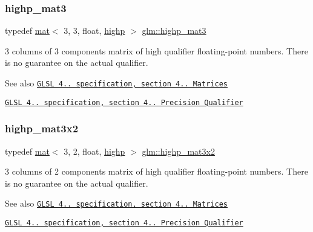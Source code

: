 \subsubsection{\texorpdfstring{highp\+\_\+mat3}{highp\_mat3}}
{\footnotesize\ttfamily typedef \hyperlink{structglm_1_1mat}{mat}$<$ 3, 3, float, \hyperlink{namespaceglm_a36ed105b07c7746804d7fdc7cc90ff25ac6f7eab42eacbb10d59a58e95e362074}{highp} $>$ \hyperlink{group__core__precision_gaa1178bd043ab93d1207bda8d06cd078c}{glm\+::highp\+\_\+mat3}}

3 columns of 3 components matrix of high qualifier floating-\/point numbers. There is no guarantee on the actual qualifier.

\begin{DoxySeeAlso}{See also}
\href{http://www.opengl.org/registry/doc/GLSLangSpec.4.20.8.pdf}{\tt G\+L\+SL 4.. specification, section 4.. Matrices} 

\href{http://www.opengl.org/registry/doc/GLSLangSpec.4.20.8.pdf}{\tt G\+L\+SL 4.. specification, section 4.. Precision Qualifier} 
\end{DoxySeeAlso}
\mbox{\label{group__core__precision_ga2188c0b772ac9d6210d46af34e04f375}} 
\subsubsection{\texorpdfstring{highp\+\_\+mat3x2}{highp\_mat3x2}}
{\footnotesize\ttfamily typedef \hyperlink{structglm_1_1mat}{mat}$<$ 3, 2, float, \hyperlink{namespaceglm_a36ed105b07c7746804d7fdc7cc90ff25ac6f7eab42eacbb10d59a58e95e362074}{highp} $>$ \hyperlink{group__core__precision_ga2188c0b772ac9d6210d46af34e04f375}{glm\+::highp\+\_\+mat3x2}}

3 columns of 2 components matrix of high qualifier floating-\/point numbers. There is no guarantee on the actual qualifier.

\begin{DoxySeeAlso}{See also}
\href{http://www.opengl.org/registry/doc/GLSLangSpec.4.20.8.pdf}{\tt G\+L\+SL 4.. specification, section 4.. Matrices} 

\href{http://www.opengl.org/registry/doc/GLSLangSpec.4.20.8.pdf}{\tt G\+L\+SL 4.. specification, section 4.. Precision Qualifier} 
\end{DoxySeeAlso}
\mbox{\label{group__core__precision_ga83105b0c326393a133a43c426aae2a9c}} 
